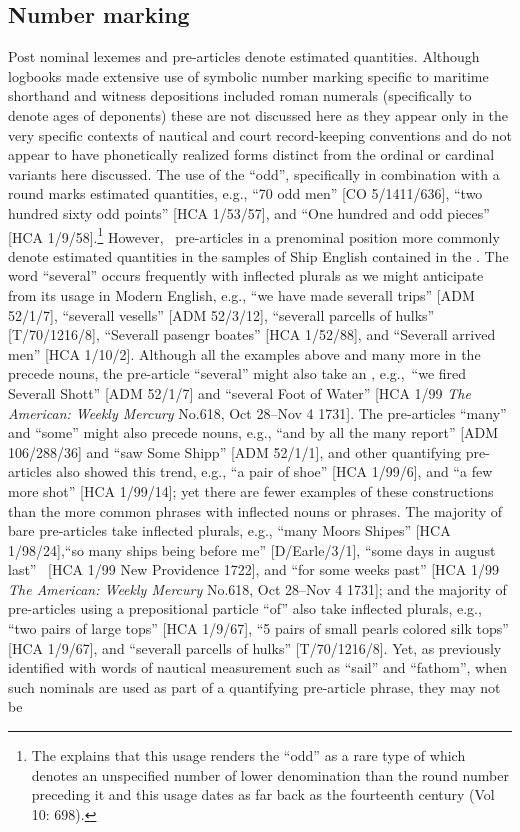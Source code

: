 \subsection{{Number marking}}\label{sec:5.3.2}

Post nominal lexemes and  pre-articles denote estimated quantities. Although logbooks made extensive use of symbolic number marking specific to maritime shorthand and witness depositions included roman numerals (specifically to denote ages of deponents) these are not discussed here as they appear only in the very specific contexts of nautical and court record-keeping conventions and do not appear to have phonetically realized forms distinct from the ordinal or cardinal variants here discussed.  The use of the  “odd”, specifically in combination with a round  marks estimated quantities, e.g., “70 odd men” [CO 5/1411/636], “two hundred sixty odd points” [HCA 1/53/57], and “One hundred and odd pieces” [HCA 1/9/58].\footnote{The \citet{oed1989} explains that this usage renders the  “odd” as a rare type of   which denotes an unspecified number of lower denomination than the round number preceding it and this usage dates as far back as the fourteenth century (Vol 10: 698).}  However,~ pre-articles in a prenominal position more commonly denote estimated quantities in the samples of Ship English contained in the . The word “several” occurs frequently with inflected plurals as we might anticipate from its usage in Modern English, e.g., “we have made severall trips” [ADM 52/1/7], “severall vesells” [ADM 52/3/12], “severall parcells of hulks” [T/70/1216/8], “Severall pasengr boates” [HCA 1/52/88], and “Severall arrived men” [HCA 1/10/2]. Although all the examples above and many more in the  precede  nouns, the pre-article “several” might also take an  , e.g.,~“we fired Severall Shott” [ADM 52/1/7] and “several Foot of Water” [HCA 1/99 \textit{The American: Weekly Mercury} No.618, Oct 28–Nov 4 1731]. The pre-articles “many” and “some” might also precede  nouns, e.g., “and by all the many report” [ADM 106/288/36] and “saw Some Shipp” [ADM 52/1/1], and other quantifying pre-articles also showed this trend, e.g., “a pair of shoe” [HCA 1/99/6], and “a few more shot” [HCA 1/99/14]; yet there are fewer examples of these constructions than the more common phrases with inflected nouns or  phrases. The majority of bare pre-articles take inflected plurals, e.g., “many Moors Shipes” [HCA 1/98/24],“so many ships being before me” [D/Earle/3/1], “some days in august last” ~[HCA 1/99 New Providence 1722], and “for some weeks past” [HCA 1/99 \textit{The American: Weekly Mercury} No.618, Oct 28–Nov 4 1731]; and the majority of pre-articles using a prepositional particle “of” also take inflected plurals, e.g., “two pairs of large tops” [HCA 1/9/67], “5 pairs of small pearls colored silk tops” [HCA 1/9/67], and “severall parcells of hulks” [T/70/1216/8]. Yet, as previously identified with words of nautical measurement such as “sail” and “fathom”, when such nominals are used as part of a quantifying pre-article phrase, they may not be 